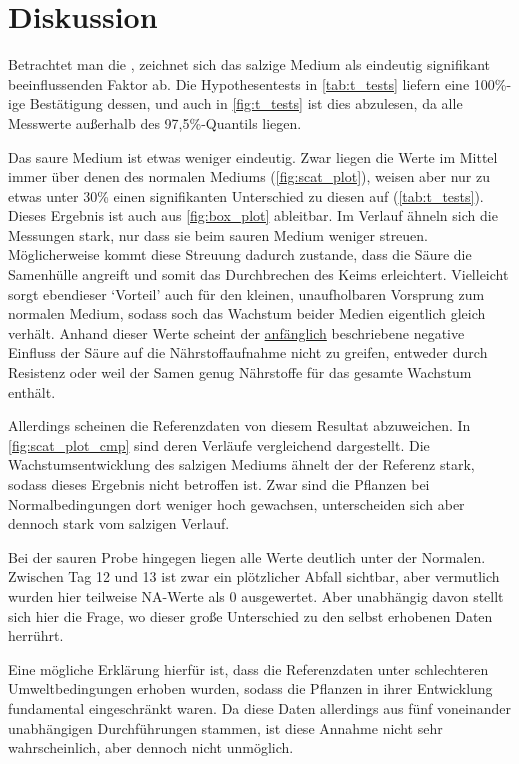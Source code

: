 \section{Diskussion} %
    \label{sec:diskussion}
    Betrachtet man die , zeichnet sich das salzige Medium als eindeutig signifikant beeinflussenden Faktor ab. Die Hypothesentests in \autoref{tab:t_tests} liefern eine 100\%-ige Bestätigung dessen, und auch in \autoref{fig:t_tests} ist dies abzulesen, da alle Messwerte außerhalb des 97,5\%-Quantils liegen.

    Das saure Medium ist etwas weniger eindeutig. Zwar liegen die Werte im Mittel immer über denen des normalen Mediums (\autoref{fig:scat_plot}), weisen aber nur zu etwas unter 30\% einen signifikanten Unterschied zu diesen auf (\autoref{tab:t_tests}). Dieses Ergebnis ist auch aus \autoref{fig:box_plot} ableitbar. Im Verlauf ähneln sich die Messungen stark, nur dass sie beim sauren Medium weniger streuen. Möglicherweise kommt diese Streuung dadurch zustande, dass die Säure die Samenhülle angreift und somit das Durchbrechen des Keims erleichtert. Vielleicht sorgt ebendieser `Vorteil' auch für den kleinen, unaufholbaren Vorsprung zum normalen Medium, sodass soch das Wachstum beider Medien eigentlich gleich verhält. Anhand dieser Werte scheint der \hyperref[sec:einleitung]{anfänglich} beschriebene negative Einfluss der Säure auf die Nährstoffaufnahme nicht zu greifen, entweder durch Resistenz oder weil der Samen genug Nährstoffe für das gesamte Wachstum enthält.

    Allerdings scheinen die Referenzdaten von diesem Resultat abzuweichen. In \autoref{fig:scat_plot_cmp} sind deren Verläufe vergleichend dargestellt. Die Wachstumsentwicklung des salzigen Mediums ähnelt der der Referenz stark, sodass dieses Ergebnis nicht betroffen ist. Zwar sind die Pflanzen bei Normalbedingungen dort weniger hoch gewachsen, unterscheiden sich aber dennoch stark vom salzigen Verlauf.

    Bei der sauren Probe hingegen liegen alle Werte deutlich unter der Normalen. Zwischen Tag 12 und 13 ist zwar ein plötzlicher Abfall sichtbar, aber vermutlich wurden hier teilweise NA-Werte als 0 ausgewertet. Aber unabhängig davon stellt sich hier die Frage, wo dieser große Unterschied zu den selbst erhobenen Daten herrührt.

    Eine mögliche Erklärung hierfür ist, dass die Referenzdaten unter schlechteren Umweltbedingungen erhoben wurden, sodass die Pflanzen in ihrer Entwicklung fundamental eingeschränkt waren. Da diese Daten allerdings aus fünf voneinander unabhängigen Durchführungen stammen, ist diese Annahme nicht sehr wahrscheinlich, aber dennoch nicht unmöglich.

